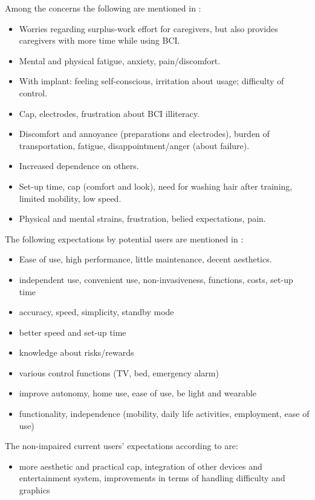 \documentclass[fleqn,11pt]{olplainarticle}
\begin{document}
Among the concerns the following are mentioned in \cite{kogel2019using}:
\begin{displayquote}
    \begin{itemize}
        \item Worries regarding surplus-work effort for caregivers, but also provides caregivers with more time while using BCI.
        \item Mental and physical fatigue, anxiety, pain/discomfort.
        \item With implant: feeling self-conscious, irritation about usage; difficulty of control.
        \item Cap, electrodes, frustration about BCI illiteracy.
        \item Discomfort and annoyance (preparations and electrodes), burden of transportation, fatigue, disappointment/anger (about failure).
        \item Increased dependence on others.
        \item Set-up time, cap (comfort and look), need for washing hair after training, limited mobility, low speed.
        \item Physical and mental strains, frustration, belied expectations, pain.
    \end{itemize}
\end{displayquote}

The following expectations by potential users are mentioned in \cite{kogel2019using}:
\begin{itemize}
    \item Ease of use, high performance, little maintenance, decent aesthetics.
    \item independent use, convenient use, non-invasiveness, functions, costs, set-up time
    \item accuracy, speed, simplicity, standby mode
    \item better speed and set-up time
    \item knowledge about risks/rewards
    \item various control functions (TV, bed, emergency alarm)
    \item improve autonomy, home use, ease of use, be light and wearable
    \item 	functionality, independence (mobility, daily life activities, employment, ease of use)
\end{itemize}

The non-impaired current users' expectations according to \cite{kogel2019using} are:
\begin{itemize}
    \item more aesthetic and practical cap, integration of other devices and entertainment system, improvements in terms of handling difficulty and graphics
\end{itemize}
\end{document}
